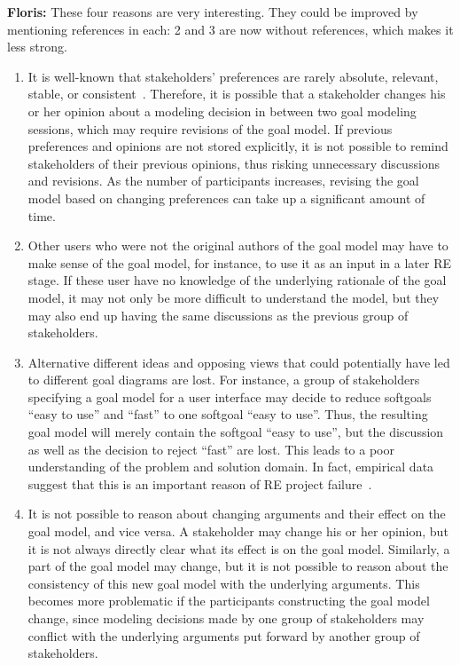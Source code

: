 \documentclass[11.5pt,two column]{llncs}
\newcommand{\floris}[1]{{\color{red}\textbf{Floris: }#1}}
\begin{document}
\floris{These four reasons are very interesting. They could be improved by mentioning references in each: 2 and 3 are now without references, which makes it less strong.}

\begin{enumerate}
\item
It is well-known that stakeholders' preferences are rarely absolute, relevant, stable, or consistent~\cite{march1978bounded}. Therefore, it is possible that a stakeholder changes his or her opinion about a modeling decision in between two goal modeling sessions, which may require revisions of the goal model. If previous preferences and opinions are not stored explicitly, it is not possible to remind stakeholders of their previous opinions, thus risking unnecessary discussions and revisions. As the number of participants increases, revising the goal model based on changing preferences can take up a significant amount of time.
\item
Other users who were not the original authors of the goal model may have to make sense of the goal model, for instance, to use it as an input in a later RE stage. If these user have no knowledge of the underlying rationale of the goal model, it may not only be more difficult to understand the model, but they may also end up having the same discussions as the previous group of stakeholders.
\item
Alternative different ideas and opposing views that could potentially have led to different goal diagrams are lost. For instance, a group of stakeholders specifying a goal model for a user interface may decide to reduce softgoals ``easy to use'' and ``fast'' to one softgoal ``easy to use''. Thus, the resulting goal model will merely contain the softgoal ``easy to use'', but the discussion as well as the decision to reject ``fast'' are lost. This leads to a poor understanding of the problem and solution domain. In fact, empirical data suggest that this is an important reason of RE project failure~\cite{curtis1988field}. 
\item
It is not possible to reason about changing arguments and their effect on the goal model, and vice versa. A stakeholder may change his or her opinion, but it is not always directly clear what its effect is on the goal model. Similarly, a part of the goal model may change, but it is not possible to reason about the consistency of this new goal model with the underlying arguments. This becomes more problematic if the participants constructing the goal model change, since modeling decisions made by one group of stakeholders may conflict with the underlying arguments put forward by another group of stakeholders.
\end{enumerate}
\end{document}

